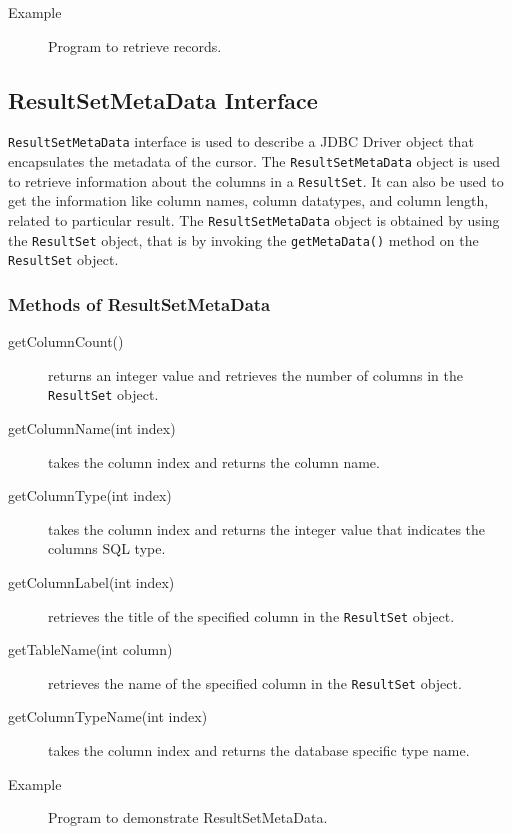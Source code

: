\documentclass[11pt,a4paper]{article}
\begin{document}
\begin{description}
\item[Example] Program to retrieve records.

\end{description}

\subsection*{ResultSetMetaData Interface}
\texttt{ResultSetMetaData} interface is used to describe a JDBC Driver object that encapsulates the metadata of the cursor. The \texttt{ResultSetMetaData} object is used to retrieve information about the columns in a \texttt{ResultSet}. It can also be used to get the information like column names, column datatypes, and column length, related to particular result. The \texttt{ResultSetMetaData} object is obtained by using the \texttt{ResultSet} object, that is by invoking the \texttt{getMetaData()} method on the \texttt{ResultSet} object.

\subsubsection*{Methods of ResultSetMetaData}
\begin{description}
    \item[getColumnCount()] returns an integer value and retrieves the number of columns in the \texttt{ResultSet} object.
    \item[getColumnName(int index)] takes the column index and returns the column name.
    \item[getColumnType(int index)] takes the column index and returns the integer value that indicates the columns SQL type.
    \item[getColumnLabel(int index)] retrieves the title of the specified column in the \texttt{ResultSet} object.
    \item[getTableName(int column)] retrieves the name of the specified column in the \texttt{ResultSet} object.
    \item[getColumnTypeName(int index)] takes the column index and returns the database specific type name.
\end{description}


\begin{description}
     \item[Example] Program to demonstrate ResultSetMetaData.
         
 \end{description}
\end{document}
